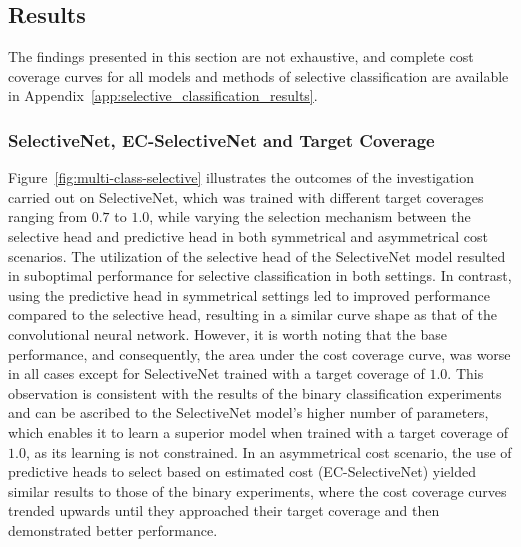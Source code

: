 \subsection{Results}
The findings presented in this section are not exhaustive, and complete cost coverage curves for all models and methods of selective classification are available in Appendix~\ref{app:selective_classification_results}.

\subsubsection{SelectiveNet, EC-SelectiveNet and Target Coverage}
Figure~\ref{fig:multi-class-selective} illustrates the outcomes of the investigation carried out on SelectiveNet, which was trained with different target coverages ranging from $0.7$ to $1.0$, while varying the selection mechanism between the selective head and predictive head in both symmetrical and asymmetrical cost scenarios. The utilization of the selective head of the SelectiveNet model resulted in suboptimal performance for selective classification in both settings. In contrast, using the predictive head in symmetrical settings led to improved performance compared to the selective head, resulting in a similar curve shape as that of the convolutional neural network. However, it is worth noting that the base performance, and consequently, the area under the cost coverage curve, was worse in all cases except for SelectiveNet trained with a target coverage of $1.0$. This observation is consistent with the results of the binary classification experiments and can be ascribed to the SelectiveNet model's higher number of parameters, which enables it to learn a superior model when trained with a target coverage of $1.0$, as its learning is not constrained. In an asymmetrical cost scenario, the use of predictive heads to select based on estimated cost (EC-SelectiveNet) yielded similar results to those of the binary experiments, where the cost coverage curves trended upwards until they approached their target coverage and then demonstrated better performance.

